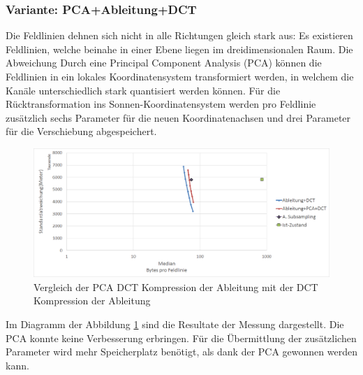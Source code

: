 \subsubsection{Variante: PCA+Ableitung+DCT}
Die Feldlinien dehnen sich nicht in alle Richtungen gleich stark aus: Es existieren Feldlinien, welche beinahe in einer Ebene liegen im dreidimensionalen Raum. Die Abweichung Durch eine Principal Component Analysis (PCA)\cite{abdi2010principal} können die Feldlinien in ein lokales Koordinatensystem transformiert werden, in welchem die Kanäle unterschiedlich stark quantisiert werden können. Für die Rücktransformation ins Sonnen-Koordinatensystem werden pro Feldlinie zusätzlich sechs Parameter für die neuen Koordinatenachsen und drei Parameter für die Verschiebung abgespeichert.

\begin{figure}[!htbp]
	\center
	\includegraphics[width=1\textwidth,keepaspectratio]{./pictures/resultate/loesung1/loesung1-4/loesung1_4.png}
	\caption{Vergleich der PCA DCT Kompression der Ableitung mit der DCT Kompression der Ableitung}
	\label{resultate:loesung1:dct:pca}
\end{figure}
Im Diagramm der Abbildung \ref{resultate:loesung1:dct:pca} sind die Resultate der Messung dargestellt. Die PCA konnte keine Verbesserung erbringen. Für die Übermittlung der zusätzlichen Parameter wird mehr Speicherplatz benötigt, als dank der PCA gewonnen werden kann.

